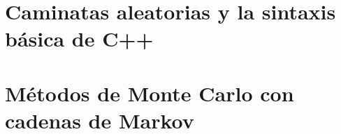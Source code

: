\documentclass[10pt,twoside,openany, letterpaper]{book}
\begin{document}
% 
% 
% 
% 
% 
% 
% 
% 
% 
% 
% 



\part{Caminatas aleatorias y la sintaxis básica de C++}






\part{Métodos de Monte Carlo con cadenas de Markov}




%

\end{document}
